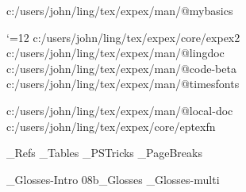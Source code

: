 
\def\epdir{c:/users/john/ling/tex/expex/}

 \epdir man/@mybasics

 \catcode`\@=12
 \epdir core/expex2
 \epdir man/@lingdoc
 \epdir man/@code-beta
 \epdir man/@timesfonts

 \epdir man/@local-doc
 \epdir core/eptexfn
%




_Refs
_Tables
_PSTricks
_PageBreaks
%
%


\bye
{}_Glosses-Intro
\get 08b_Glosses
_Glosses-multi

